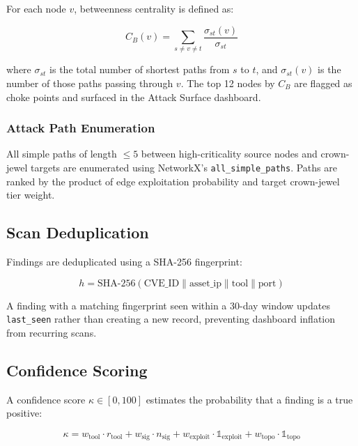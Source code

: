 \documentclass[conference]{IEEEtran}
\begin{document}
For each node $v$, betweenness centrality is defined as:

\begin{equation}
  C_B(v) = \sum_{s \neq v \neq t} \frac{\sigma_{st}(v)}{\sigma_{st}}
\end{equation}

where $\sigma_{st}$ is the total number of shortest paths from $s$ to $t$, and $\sigma_{st}(v)$ is the number of those paths passing through $v$. The top 12 nodes by $C_B$ are flagged as choke points and surfaced in the Attack Surface dashboard.

\subsubsection{Attack Path Enumeration}

All simple paths of length $\leq 5$ between high-criticality source nodes and crown-jewel targets are enumerated using NetworkX's \texttt{all\_simple\_paths}. Paths are ranked by the product of edge exploitation probability and target crown-jewel tier weight.

\subsection{Scan Deduplication}

Findings are deduplicated using a SHA-256 fingerprint:

\begin{equation}
  h = \text{SHA-256}(\text{CVE\_ID} \| \text{asset\_ip} \| \text{tool} \| \text{port})
\end{equation}

A finding with a matching fingerprint seen within a 30-day window updates \texttt{last\_seen} rather than creating a new record, preventing dashboard inflation from recurring scans.

\subsection{Confidence Scoring}

A confidence score $\kappa \in [0, 100]$ estimates the probability that a finding is a true positive:

\begin{equation}
  \kappa = w_{\text{tool}} \cdot r_{\text{tool}} + w_{\text{sig}} \cdot n_{\text{sig}} + w_{\text{exploit}} \cdot \mathbb{1}_{\text{exploit}} + w_{\text{topo}} \cdot \mathbb{1}_{\text{topo}}
\end{equation}
\end{document}
